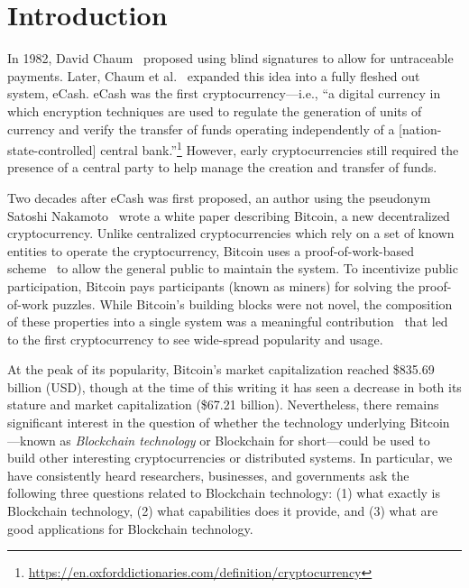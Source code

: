 
\section{Introduction}

In 1982, David Chaum~\cite{Cha82} proposed using blind signatures to allow for untraceable payments.
Later, Chaum et al.~\cite{chaum1988untraceable} expanded this idea into a fully fleshed out system, eCash.
eCash was the first cryptocurrency---i.e., ``a digital currency in which encryption techniques are used to regulate the generation of units of currency and verify the transfer of funds operating independently of a [nation-state-controlled] central bank.''\footnote{\url{https://en.oxforddictionaries.com/definition/cryptocurrency}}
However, early cryptocurrencies still required the presence of a central party to help manage the creation and transfer of funds.

Two decades after eCash was first proposed, an author using the pseudonym Satoshi Nakamoto~\cite{Nak08} wrote a white paper describing Bitcoin, a new decentralized cryptocurrency.
Unlike centralized cryptocurrencies which rely on a set of known entities to operate the cryptocurrency, Bitcoin uses a proof-of-work-based scheme~\cite{DN93,back1997partial} to allow the general public to maintain the system.
To incentivize public participation, Bitcoin pays participants (known as miners) for solving the proof-of-work puzzles.
While Bitcoin's building blocks were not novel, the composition of these properties into a single system was a meaningful contribution~\cite{Narayanan17} that led to the first cryptocurrency to see wide-spread popularity and usage.

At the peak of its popularity, Bitcoin's market capitalization reached \$835.69 billion (USD), though at the time of this writing it has seen a decrease in both its stature and market capitalization (\$67.21 billion).
Nevertheless, there remains significant interest in the question of whether the technology underlying Bitcoin---known as \emph{Blockchain technology} or {Blockchain} for short---could be used to build other interesting cryptocurrencies or distributed systems.
In particular, we have consistently heard researchers, businesses, and governments ask the following three questions related to Blockchain technology: (1) what exactly is Blockchain technology, (2) what capabilities does it provide, and (3) what are good applications for Blockchain technology.%

